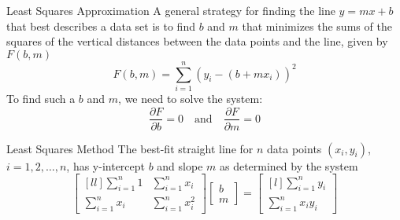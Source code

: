 \documentclass{beamer}
\begin{document}
\begin{frame}
\begin{block}{Least Squares Approximation}
A general strategy for finding the line $y=mx+b$ that best describes a data set is to find $b$ and $m$ that minimizes the sums of the squares of the vertical distances between the data points and the line, given by $F(b,m)$
\begin{equation*}
F(b,m)=\sum\limits_{i=1}^{n}{\left(y_i-(b+mx_i)\right)}^2
\end{equation*}\pause
To find such a $b$ and $m$, we need to solve the system:
\begin{equation*}
\dfrac{\partial F}{\partial b}=0
\quad\text{and}\quad
\dfrac{\partial F}{\partial m}=0
\end{equation*}
\end{block}
\end{frame}

\begin{frame}
\begin{block}{Least Squares Method}
The best-fit straight line for $n$ data points $(x_i, y_i)$, $i=1,2,\dots,n$, has y-intercept $b$ and slope $m$ as determined by the system
\begin{equation*}
\begin{bmatrix}[ll]
\sum\limits_{i=1}^n 1   & \sum\limits_{i=1}^n x_i   \\
\sum\limits_{i=1}^n x_i & \sum\limits_{i=1}^n x_i^2
\end{bmatrix}
\begin{bmatrix}
b \\
m
\end{bmatrix}
=
\begin{bmatrix}[l]
\sum\limits_{i=1}^n y_i \\
\sum\limits_{i=1}^n x_i y_i
\end{bmatrix}
\end{equation*}
\end{block}
\end{frame}
\end{document}
